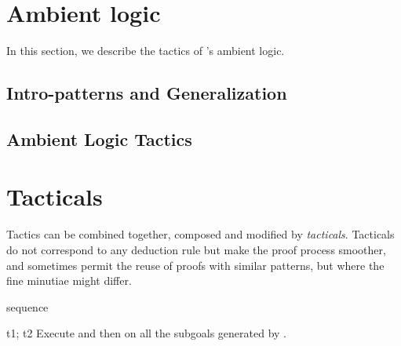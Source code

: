 \section{Ambient logic}
\label{AmbientLogic}

In this section, we describe the tactics of \EasyCrypt's
ambient logic.

\subsection{Intro-patterns and Generalization}
\label{IntroPatterns}

\subsection{Ambient Logic Tactics}



































\section{Tacticals}
\label{Tacticals}

Tactics can be combined together, composed and modified by
\emph{tacticals}. Tacticals do not correspond to any deduction rule
but make the proof process smoother, and sometimes permit the reuse of
proofs with similar patterns, but where the fine minutiae might
differ.

\begin{tactic}[t1; t2]{sequence}
  \begin{tsyntax}[empty]{t1; t2}
  Execute  and then  on all the subgoals generated by .
  \end{tsyntax}
\end{tactic}

